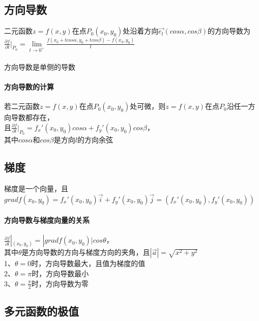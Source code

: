 \documentclass{article}
\begin{document}
\begin{flushleft}
	\subsection{方向导数}
	二元函数$z=f(x,y)$在点$P_0(x_0,y_0)$处沿着方向$\vec{e_l}(cos\alpha,cos\beta)$的方向导数为
	$\frac{\partial f}{\partial l}|_{P_0}=\lim\limits_{t\to 0^+}\frac{f(x_0+tcos\alpha,y_0+tcos\beta)-f(x_0,y_0)}{t}$\\
	~\\
	方向导数是单侧的导数\\
	
	\paragraph{方向导数的计算}
	若二元函数$z=f(x,y)$在点$P_0(x_0,y_0)$处可微，则$z=f(x,y)$在点$P_0$沿任一方向导数都存在，\\
	且$\frac{\partial f}{\partial l}|_{P_0}=f_x'(x_0,y_0)cos\alpha+f_y'(x_0,y_0)cos\beta$，\\
	其中$cos\alpha$和$cos\beta$是方向$l$的方向余弦\\
	
	\subsection{梯度}
	梯度是一个向量，且$gradf(x_0,y_0)=f_x'(x_0,y_0)\vec{i}+f_y'(x_0,y_0)\vec{j}=(f_x'(x_0,y_0),f_y'(x_0,y_0))$\\
	
	\paragraph{方向导数与梯度向量的关系}
	$\frac{\partial f}{\partial l}|_{(x_0,y_0)}=|gradf(x_0,y_0)|cos\theta$，\\
	其中$\theta$是方向导数的方向与梯度方向的夹角，且$|\vec{a}|=\sqrt{x^2+y^2}$\\
	1、$\theta=0$时，方向导数最大，且值为梯度的值\\
	2、$\theta=\pi$时，方向导数最小\\
	3、$\theta=\frac{\pi}{2}$时，方向导数为零\\
	
	\subsection{多元函数的极值}
	
	
	
\end{flushleft}
\end{document}
